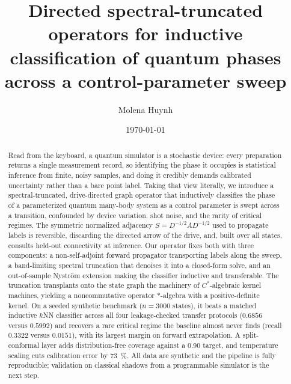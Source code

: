 \documentclass[aps,prresearch,reprint,amsmath,amssymb,nofootinbib,superscriptaddress,floatfix]{revtex4-2}
\theoremstyle{definition}
\theoremstyle{remark}
\theoremstyle{plain}
\begin{document}
\title{Directed spectral-truncated operators for inductive classification of quantum phases across a control-parameter sweep}

\author{Molena Huynh}
\date{\today}

\begin{abstract}
Read from the keyboard, a quantum simulator is a stochastic device: every preparation returns a single
measurement record, so identifying the phase it occupies is statistical inference from finite, noisy
samples, and doing it credibly demands calibrated uncertainty rather than a bare point label. Taking that
view literally, we introduce a spectral-truncated, drive-directed graph operator that inductively classifies
the phase of a parameterized quantum many-body system as a control parameter is swept across a transition,
confounded by device variation, shot noise, and the rarity of critical regimes. The symmetric normalized adjacency
$S=D^{-1/2}AD^{-1/2}$ used to propagate labels is reversible, discarding the directed arrow of the drive,
and, built over all states, consults held-out connectivity at inference. Our operator fixes both with three components: a non-self-adjoint forward propagator
transporting labels along the sweep, a band-limiting spectral truncation that denoises it into a closed-form
solve, and an out-of-sample Nystr\"om extension making the classifier inductive and transferable. The truncation transplants onto the state graph the
machinery of $C^*$-algebraic kernel machines, yielding a noncommutative operator $*$-algebra with a
positive-definite kernel. On a seeded synthetic benchmark ($n=\num{3000}$ states), it beats a matched inductive
$k$NN classifier across all four leakage-checked transfer protocols ($\num{0.6856}$ versus $\num{0.5992}$)
and recovers a rare critical regime the baseline almost never finds (recall $\num{0.3322}$ versus
$\num{0.0151}$), with its largest margin on forward extrapolation. A split-conformal layer adds distribution-free coverage against a $\num{0.90}$ target, and
temperature scaling cuts calibration error by \SI{73}{\percent}. All data are synthetic and the
pipeline is fully reproducible; validation on classical shadows from a programmable simulator is the next step.
\end{abstract}

\maketitle
\end{document}
